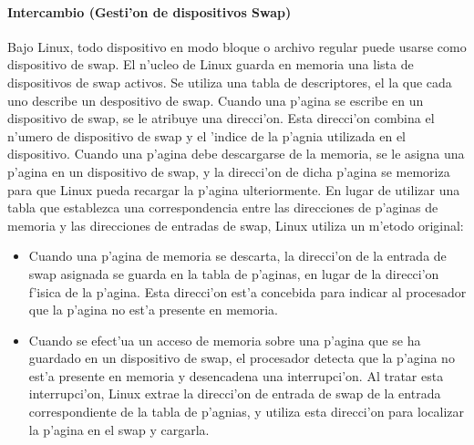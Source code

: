 \paragraph{Intercambio (Gesti'on de dispositivos Swap)}
Bajo Linux, todo dispositivo en modo bloque o archivo regular puede usarse como dispositivo de swap. El n'ucleo de Linux guarda en memoria una lista de dispositivos de swap activos. Se utiliza una tabla de descriptores, el la que cada uno describe un despositivo de swap.
Cuando una p'agina se escribe en un dispositivo de swap, se le atribuye una direcci'on. Esta direcci'on combina el n'umero de dispositivo de swap y el 'indice de la p'agnia utilizada en el dispositivo. Cuando una p'agina debe descargarse de la memoria, se le asigna una p'agina en un dispositivo de swap, y la direcci'on de dicha p'agina se memoriza para que Linux pueda recargar la p'agina ulteriormente. En lugar de utilizar una tabla que establezca una correspondencia entre las direcciones de p'aginas de memoria y las direcciones de entradas de swap, Linux utiliza un m'etodo original:

\begin{itemize}
    \item Cuando una p'agina de memoria se descarta, la direcci'on de la entrada de swap asignada se guarda en la tabla de p'aginas, en lugar de la direcci'on f'isica de la p'agina. Esta direcci'on est'a concebida para indicar al procesador que la p'agina no est'a presente en memoria.
    \item Cuando se efect'ua un acceso de memoria sobre una p'agina que se ha guardado en un dispositivo de swap, el procesador detecta que la p'agina no est'a presente en memoria y desencadena una interrupci'on. Al tratar esta interrupci'on, Linux extrae la direcci'on de entrada de swap de la entrada correspondiente de la tabla de p'agnias, y utiliza esta direcci'on para localizar la p'agina en el swap y cargarla.
\end{itemize}

